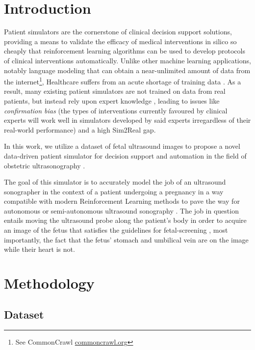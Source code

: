 \section{Introduction}

Patient simulators are the cornerstone of clinical decision support solutions, providing a means to validate the efficacy of medical interventions in silico so cheaply that reinforcement learning algorithms can be used to develop protocols of clinical interventions automatically.
Unlike other machine learning applications, notably language modeling that can obtain a near-unlimited amount of data from the internet\footnote{See CommonCrawl \cite{commoncrawl} \url{commoncrawl.org}}, Healthcare suffers from an acute shortage of training data \cite{datashortage}.
As a result, many existing patient simulators are not trained on data from real patients, but instead rely upon expert knowledge \cite{towards}, leading to issues like \emph{confirmation bias} (the types of interventions currently favoured by clinical experts will work well in simulators developed by said experts irregardless of their real-world performance) and a high Sim2Real \cite{sim2real} gap.

In this work, we utilize a dataset of fetal ultrasound images to propose a novel data-driven patient simulator for decision support and automation in the field of obstetric ultrasonography \cite{obstetrics-sonography}.

The goal of this simulator is to accurately model the job of an ultrasound sonographer in the context of a patient undergoing a pregnancy in a way compatible with modern Reinforcement Learning methods \cite{rl-review}
to pave the way for autonomous or semi-autonomous ultrasound sonography \cite{autonomous-ultrasound-review}.
The job in question entails moving the ultrasound probe along the patient's body in order to acquire an image of the fetus that satisfies the guidelines for fetal-screening \cite{isoug-guidelines}, most importantly, the fact that the fetus' stomach and umbilical vein are on the image while their heart is not.

\section{Methodology}

\subsection{Dataset}

